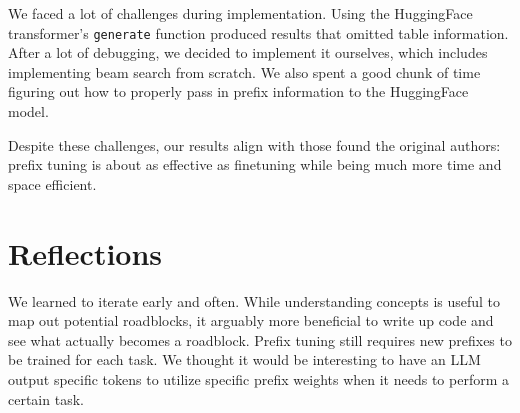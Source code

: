 \documentclass[11pt]{article} %
\begin{document}
We faced a lot of challenges during implementation. Using the HuggingFace transformer's \texttt{generate} function produced results that omitted table information. After a lot of debugging, we decided to implement it ourselves, which includes implementing beam search from scratch. We also spent a good chunk of time figuring out how to properly pass in prefix information to the HuggingFace model.

Despite these challenges, our results align with those found the original authors: prefix tuning is about as effective as finetuning while being much more time and space efficient.

\section{Reflections}
We learned to iterate early and often. While understanding concepts is useful to map out potential roadblocks, it arguably more beneficial to write up code and see what actually becomes a roadblock. Prefix tuning still requires new prefixes to be trained for each task. We thought it would be interesting to have an LLM output specific tokens to utilize specific prefix weights when it needs to perform a certain task.


\end{document}
